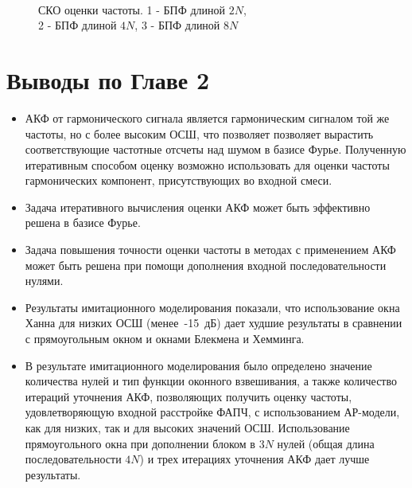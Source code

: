 \begin{figure}[t!]
	\centering
	\caption{\\СКО оценки частоты. 1 - БПФ длиной ${2N}$,\\2 - БПФ длиной ${4N}$, 3 - БПФ длиной ${8N}$}
	\label{pic:2vs4vs8}
\end{figure}


\section{Выводы по Главе 2}

\begin{itemize}
\item АКФ от гармонического сигнала является гармоническим сигналом той же частоты, но с более высоким ОСШ, что позволяет позволяет вырастить соответствующие частотные отсчеты над шумом
	в базисе Фурье. Полученную итеративным способом оценку возможно использовать для оценки частоты гармонических компонент, присутствующих во входной смеси.

\item Задача итеративного вычисления оценки АКФ может быть эффективно решена в базисе Фурье.

\item Задача повышения точности оценки частоты в методах с применением АКФ может быть решена при помощи дополнения входной последовательности нулями.

\item Результаты имитационного моделирования показали, что использование окна Ханна для низких ОСШ \mbox{(менее -15 дБ)} дает худшие результаты в сравнении с прямоугольным
	окном и окнами Блекмена и Хемминга.

\item В результате имитационного моделирования было определено значение количества нулей и тип функции оконного взвешивания, а также количество итераций уточнения АКФ,
	позволяющих получить оценку частоты, удовлетворяющую входной расстройке ФАПЧ, с использованием АР-модели, как для низких, так и для высоких значений ОСШ.
	Использование прямоугольного окна при дополнении блоком в ${3N}$ нулей (общая длина последовательности ${4N}$) и трех итерациях уточнения АКФ дает лучше результаты.

\end{itemize}

\clearpage
{}			%

\clearpage
